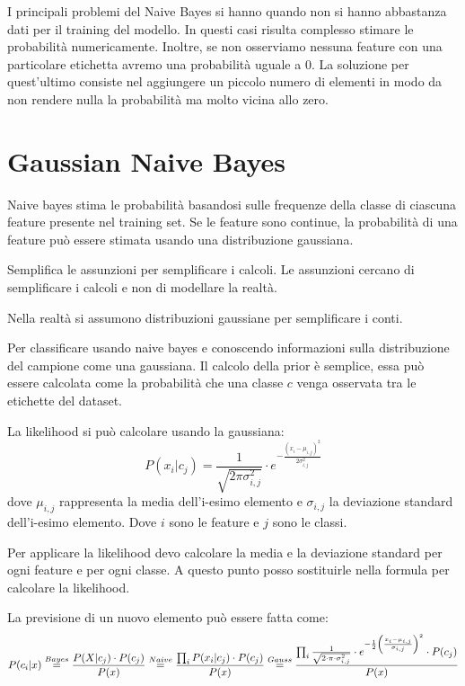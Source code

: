 I principali problemi del Naive Bayes si hanno quando non si hanno abbastanza
dati per il training del modello. In questi casi risulta complesso stimare le
probabilità numericamente. Inoltre, se non osserviamo nessuna feature con una
particolare etichetta avremo una probabilità uguale a $0$. La soluzione per
quest'ultimo consiste nel aggiungere un piccolo numero di elementi in modo da
non rendere nulla la probabilità ma molto vicina allo zero.
\section{Gaussian Naive Bayes}
Naive bayes stima le probabilità basandosi sulle frequenze della classe di ciascuna
feature presente nel training set. Se le feature sono continue, la probabilità
di una feature può essere stimata usando una distribuzione gaussiana.

Semplifica le assunzioni per semplificare i calcoli. Le assunzioni cercano di
semplificare i calcoli e non di modellare la realtà.

Nella realtà si assumono distribuzioni gaussiane per semplificare i conti.

Per classificare usando naive bayes e conoscendo informazioni sulla distribuzione
del campione come una gaussiana. Il calcolo della prior è semplice, essa può essere
calcolata come la probabilità che una classe $c$ venga osservata tra le etichette del dataset.

La likelihood si può calcolare usando la gaussiana:
\begin{equation}
    P(x_i|c_j) = \frac{1}{\sqrt{2 \pi \sigma_{i, j}^2}} \cdot e^{-\frac{(x_i - \mu_{i,j})^2}{2 \sigma_{i,j}^2}}
\end{equation}
dove $\mu_{i, j}$ rappresenta la media dell'i-esimo elemento e $\sigma_{i, j}$
la deviazione standard dell'i-esimo elemento. Dove $i$ sono le feature e $j$ sono le classi.

Per applicare la likelihood devo calcolare la media e la deviazione standard per
ogni feature e per ogni classe. A questo punto posso sostituirle nella formula
per calcolare la likelihood.

La previsione di un nuovo elemento può essere fatta come:
\begin{equation*}
    P(c_i | x) \stackrel{Bayes}{=} \frac{P(X | c_j) \cdot P(c_j)}{P(x)} \\ \stackrel{Naive}{=} \frac{\prod_i P(x_i | c_j) \cdot P(c_j)}{P(x)} \\ \stackrel{Gauss}{=} \frac{\prod_i \frac{1}{\sqrt{2\cdot \pi \cdot \sigma_{i, j}^2}} \cdot e^{- \frac{1}{2} \left(\frac{x_i - \mu_{i, j}}{\sigma_{i, j}}\right)^2} \cdot P(c_j)}{P(x)}
\end{equation*}
